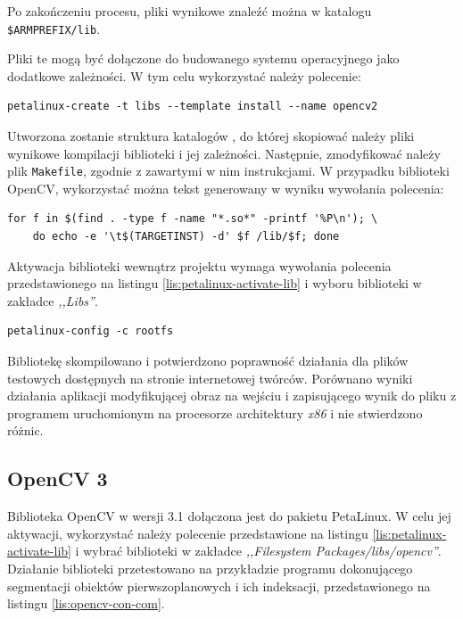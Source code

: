 Po zakończeniu procesu, pliki wynikowe znaleźć można w katalogu \texttt{\$ARMPREFIX/lib}.

Pliki te mogą być dołączone do budowanego systemu operacyjnego jako dodatkowe zależności. 
W tym celu wykorzystać należy polecenie:

\begin{lstlisting}[breaklines=true]
petalinux-create -t libs --template install --name opencv2
\end{lstlisting}

Utworzona zostanie struktura katalogów , do której skopiować należy pliki wynikowe kompilacji biblioteki i jej zależności. 
Następnie, zmodyfikować należy plik \texttt{Makefile}, zgodnie z zawartymi w nim instrukcjami. 
W przypadku biblioteki OpenCV, wykorzystać można tekst generowany w wyniku wywołania polecenia:

\begin{lstlisting}[breaklines=true]
for f in $(find . -type f -name "*.so*" -printf '%P\n'); \
	do echo -e '\t$(TARGETINST) -d' $f /lib/$f; done
\end{lstlisting}

Aktywacja biblioteki wewnątrz projektu wymaga wywołania polecenia przedstawionego na listingu \ref{lis:petalinux-activate-lib} i wyboru biblioteki w zakładce \textit{,,Libs''}. 

\begin{lstlisting}[caption=Dołączenie biblioteki do projektu PetaLinux., label=lis:petalinux-activate-lib]
petalinux-config -c rootfs
\end{lstlisting}



Bibliotekę skompilowano i potwierdzono poprawność działania dla plików testowych dostępnych na stronie internetowej twórców. 
Porównano wyniki działania aplikacji modyfikującej obraz na wejściu i zapisującego wynik do pliku z programem uruchomionym na procesorze architektury \emph{x86} i nie stwierdzono różnic.

\subsection{OpenCV 3}
Biblioteka OpenCV w wersji 3.1 dołączona jest do pakietu PetaLinux. 
W celu jej aktywacji, wykorzystać należy polecenie przedstawione na listingu \ref{lis:petalinux-activate-lib} i wybrać biblioteki w zakładce \emph{,,Filesystem Packages/libs/opencv''}.
Działanie biblioteki przetestowano na przykładzie programu dokonującego segmentacji obiektów pierwszoplanowych i ich indeksacji, przedstawionego na listingu \ref{lis:opencv-con-com}.

